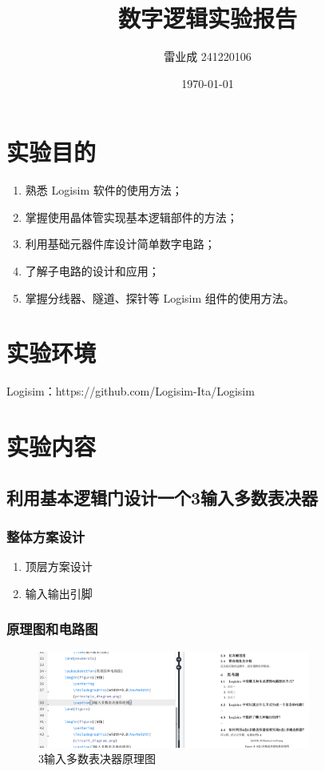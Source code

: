 \documentclass{article}
\title{数字逻辑实验报告}
\author{雷业成 241220106}
\date{\today}
\begin{document}
\maketitle

\section{实验目的}
\begin{enumerate}
  \item 熟悉 Logisim 软件的使用方法；
  \item 掌握使用晶体管实现基本逻辑部件的方法；
  \item 利用基础元器件库设计简单数字电路；
  \item 了解子电路的设计和应用；
  \item 掌握分线器、隧道、探针等 Logisim 组件的使用方法。
\end{enumerate}

\section{实验环境}
Logisim：https://github.com/Logisim-Ita/Logisim

\section{实验内容}
\subsection{利用基本逻辑门设计一个3输入多数表决器}
\subsubsection{整体方案设计}
\begin{enumerate}
    \item 顶层方案设计
    \item 输入输出引脚
\end{enumerate}

\subsubsection{原理图和电路图}
\begin{figure}[htb]
  \centering
  \includegraphics[width=0.8\textwidth]{image.png} %
  \caption{3输入多数表决器原理图}
\end{figure}
\end{document}
